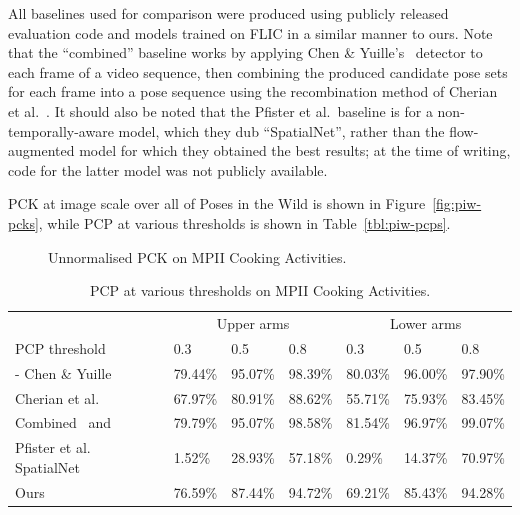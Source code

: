 \documentclass[runningheads]{llncs}
\begin{document}
All baselines used for comparison were produced using publicly released
evaluation code and models trained on FLIC in a similar manner to ours. Note
that the ``combined'' baseline works by applying Chen \&
Yuille's~\cite{chen2014articulated} detector to each frame of a video sequence,
then combining the produced candidate pose sets for each frame into a pose
sequence using the recombination method of Cherian et
al.~\cite{cherian2014mixing}. It should also be noted that the Pfister et al.\
baseline is for a non-temporally-aware model, which they dub ``SpatialNet'',
rather than the flow-augmented model for which they obtained the best results;
at the time of writing, code for the latter model was not publicly available.

PCK at image scale over all of Poses in the Wild is shown in
Figure~\ref{fig:piw-pcks}, while PCP at various thresholds is shown in
Table~\ref{tbl:piw-pcps}.

\begin{figure}[b]
\begin{center}

\end{center}
\vspace{-8mm}
\caption{Unnormalised PCK on MPII Cooking Activities.}
\label{fig:mpii-pcks}
\end{figure}

\begin{table}
{\footnotesize\tabulinesep=1mm
\begin{tabu} to \textwidth {X[2l] || X[c]X[c]X[c] | X[c]X[c]X[c]}
& \multicolumn{3}{c|}{Upper arms} & \multicolumn{3}{c}{Lower arms}\\
PCP threshold & 0.3 & 0.5 & 0.8 & 0.3 & 0.5 & 0.8\\
\tabucline-
Chen \& Yuille~\cite{chen2014articulated} &
79.44\% & 95.07\% & 98.39\% & 80.03\% & 96.00\% & 97.90\%\\
Cherian et al.~\cite{cherian2014mixing} &
67.97\% & 80.91\% & 88.62\% & 55.71\% & 75.93\% & 83.45\%\\
Combined~\cite{cherian2014mixing} and~\cite{chen2014articulated} &
79.79\% & 95.07\% & 98.58\% & 81.54\% & 96.97\% & 99.07\%\\
Pfister et al. SpatialNet~\cite{pfister2015flowing} &
1.52\% & 28.93\% & 57.18\% & 0.29\% & 14.37\% & 70.97\%\\
Ours &
76.59\% & 87.44\% & 94.72\% & 69.21\% & 85.43\% & 94.28\%\\
\end{tabu}}\\
\caption{PCP at various thresholds on MPII Cooking Activities.}
\label{tbl:mpii-pcps}
\end{table}
\end{document}
